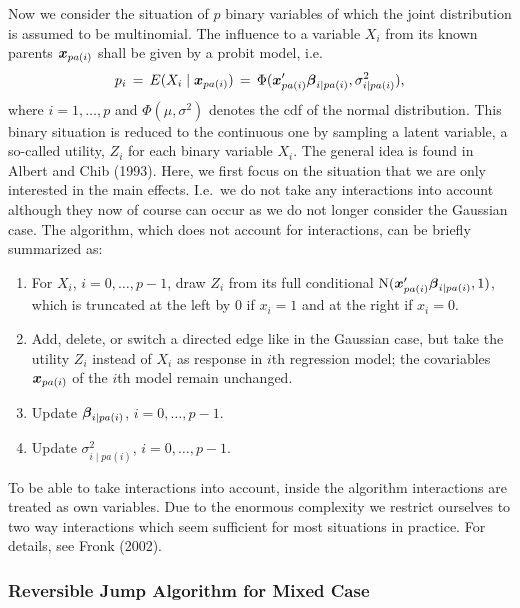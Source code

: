 Now we consider the situation of $p$ binary variables of which the
joint distribution is assumed to be multinomial. The influence to
a variable $X_i$ from its known parents $\mbox{\boldmath $x$}_{pa(i)}$ shall be
given by a probit model, i.e.~
\begin{eqnarray} \label{probit}
p_{i} \,=\,  E(X_{i} \mid \x_{pa(i)})
      \,=\,  \Phi (  \x_{pa(i)}'\mbeta_{i \mid pa(i)}, \sigma_{i \mid pa(i)}^2),
\end{eqnarray}
where $i=1, \dots , p$ and  $\Phi (\mu ,\sigma^2)$ denotes the cdf
of the normal distribution. This binary situation is reduced to
the continuous one by sampling a latent variable, a so-called
utility, $Z_i$ for each binary variable $X_i$. The general idea is
found in Albert and Chib (1993). Here, we first focus on the
situation that we are only interested in the main effects. I.e.~we
do not take any interactions into account although they now of
course can occur as we do not longer consider the Gaussian case.
The algorithm, which does not account for interactions, can be
briefly summarized as:
%
\begin{enumerate}
\item  For $X_i$, $i=0, \dots, p-1$, draw $Z_{i}$ from its full conditional
        $\mbox{N}(\mbox{\boldmath $x$}_{pa(i)}' \mbox{\boldmath $\beta$}_{i \mid pa(i)},1)$, which is truncated at the left by 0 if $x_{i}=1$
        and at the  right if $x_{i}=0$.
\item Add, delete, or switch a directed edge like in the Gaussian case, but take the utility $Z_i$ instead of
$X_i$ as response in $i$th regression model; the covariables
$\mbox{\boldmath $x$}_{pa(i)}$ of the $i$th model remain unchanged.
\item Update  $\mbox{\boldmath $\beta$}_{i\mid pa(i)}$, $i=0, \dots, p-1$.
\item Update $\sigma^2_{i\mid pa(i)}$, $i=0, \dots, p-1$.
\end{enumerate}

To be able to take interactions into account, inside the algorithm
interactions are treated as own variables. Due to the enormous
complexity we restrict ourselves to two way interactions which
seem sufficient for most situations in practice. For details, see
Fronk (2002).

\subsubsection*{Reversible Jump Algorithm for Mixed Case}

